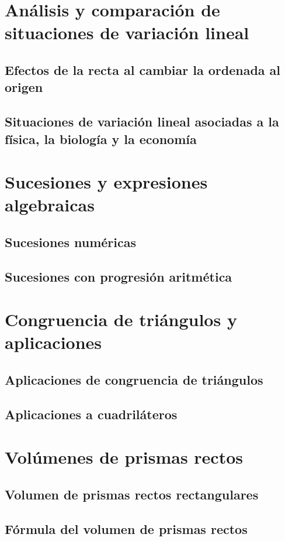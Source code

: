 \documentclass[11pt]{book}
\begin{document}
\section{Análisis y comparación de situaciones de variación lineal}
\subsection{Efectos de la recta al cambiar la ordenada al origen}
\subsection{Situaciones de variación lineal asociadas a la física, la biología y la economía}

\newpage \thispagestyle{plain}
\section{Sucesiones y expresiones algebraicas}
\subsection{Sucesiones numéricas}
\subsection{Sucesiones con progresión aritmética}

\newpage \thispagestyle{plain}
\section{Congruencia de triángulos y aplicaciones}
\subsection{Aplicaciones de congruencia de triángulos}
\subsection{Aplicaciones a cuadriláteros}

\newpage \thispagestyle{plain}
\section{Vol\'umenes de prismas rectos}
\subsection{Volumen de prismas rectos rectangulares}
\subsection{Fórmula del volumen de prismas rectos}
\end{document}
